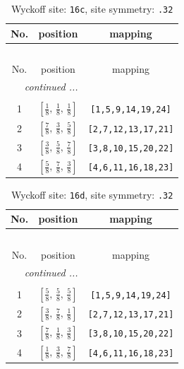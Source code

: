 \documentclass[fleqn,8pt]{jsarticle}
\begin{document}
\renewcommand{\arraystretch}{1.2}
\begin{longtable}{ccc}
\caption{Wyckoff site: {\tt 16c}, site symmetry: {\tt .32}}
 \\
 \hline \hline
No. & position & mapping \\ \hline \endfirsthead

\multicolumn{2}{l}{\tablename\ \thetable{}} \\
 \hline \hline
No. & position & mapping \\ \hline \endhead

 \hline \hline
\multicolumn{2}{r}{\footnotesize\it continued ...} \\ \endfoot

 \hline \hline
\multicolumn{2}{r}{} \\ \endlastfoot

1 & $\left[ \frac{1}{8},\, \frac{1}{8},\, \frac{1}{8} \right]$ & {\tt [1,5,9,14,19,24]} \\ \hline
2 & $\left[ \frac{7}{8},\, \frac{3}{8},\, \frac{5}{8} \right]$ & {\tt [2,7,12,13,17,21]} \\ \hline
3 & $\left[ \frac{3}{8},\, \frac{5}{8},\, \frac{7}{8} \right]$ & {\tt [3,8,10,15,20,22]} \\ \hline
4 & $\left[ \frac{5}{8},\, \frac{7}{8},\, \frac{3}{8} \right]$ & {\tt [4,6,11,16,18,23]} \\
\end{longtable}
\renewcommand{\arraystretch}{1.2}
\begin{longtable}{ccc}
\caption{Wyckoff site: {\tt 16d}, site symmetry: {\tt .32}}
 \\
 \hline \hline
No. & position & mapping \\ \hline \endfirsthead

\multicolumn{2}{l}{\tablename\ \thetable{}} \\
 \hline \hline
No. & position & mapping \\ \hline \endhead

 \hline \hline
\multicolumn{2}{r}{\footnotesize\it continued ...} \\ \endfoot

 \hline \hline
\multicolumn{2}{r}{} \\ \endlastfoot

1 & $\left[ \frac{5}{8},\, \frac{5}{8},\, \frac{5}{8} \right]$ & {\tt [1,5,9,14,19,24]} \\ \hline
2 & $\left[ \frac{3}{8},\, \frac{7}{8},\, \frac{1}{8} \right]$ & {\tt [2,7,12,13,17,21]} \\ \hline
3 & $\left[ \frac{7}{8},\, \frac{1}{8},\, \frac{3}{8} \right]$ & {\tt [3,8,10,15,20,22]} \\ \hline
4 & $\left[ \frac{1}{8},\, \frac{3}{8},\, \frac{7}{8} \right]$ & {\tt [4,6,11,16,18,23]} \\
\end{longtable}
\end{document}
